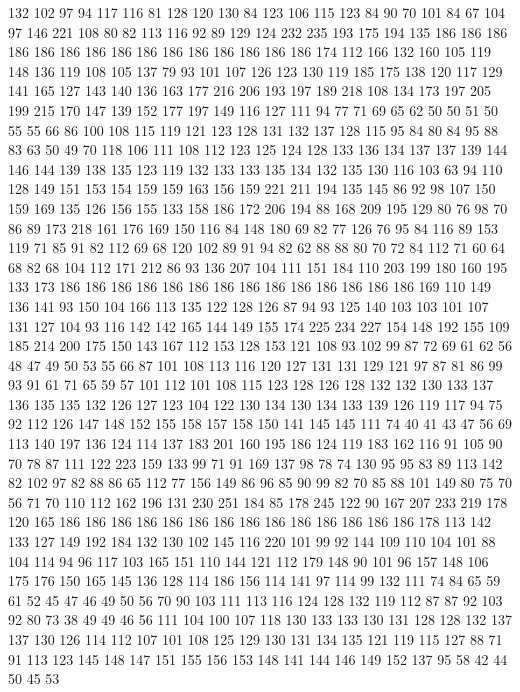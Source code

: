132 102 97 94 117 116 81 128 120 130 84 123 106 115 123 84 90 70 101 84
67 104 97 146 221 108 80 82 113 116 92 89 129 124 232 235 193 175 194 135
186 186 186 186 186 186 186 186 186 186 186 186 186 186 186 174 112 166 132 160
105 119 148 136 119 108 105 137 79 93 101 107 126 123 130 119 185 175 138 120
117 129 141 165 127 143 140 136 163 177 216 206 193 197 189 218 108 134 173 197
205 199 215 170 147 139 152 177 197 149 116 127 111 94 77 71 69 65 62 50
50 51 50 55 55 66 86 100 108 115 119 121 123 128 131 132 137 128 115 95
84 80 84 95 88 83 63 50 49 70 118 106 111 108 112 123 125 124 128 133
136 134 137 137 139 144 146 144 139 138 135 123 119 132 133 133 135 134 132 135
130 116 103 63 94 110 128 149 151 153 154 159 159 163 156 159 221 211 194 135
145 86 92 98 107 150 159 169 135 126 156 155 133 158 186 172 206 194 88 168
209 195 129 80 76 98 70 86 89 173 218 161 176 169 150 116 84 148 180 69
82 77 126 76 95 84 116 89 153 119 71 85 91 82 112 69 68 120 102 89
91 94 82 62 88 88 80 70 72 84 112 71 60 64 68 82 68 104 112 171
212 86 93 136 207 104 111 151 184 110 203 199 180 160 195 133 173 186 186 186
186 186 186 186 186 186 186 186 186 186 186 169 110 149 136 141 93 150 104 166
113 135 122 128 126 87 94 93 125 140 103 103 101 107 131 127 104 93 116 142
142 165 144 149 155 174 225 234 227 154 148 192 155 109 185 214 200 175 150 143
167 112 153 128 153 121 108 93 102 99 87 72 69 61 62 56 48 47 49 50
53 55 66 87 101 108 113 116 120 127 131 131 129 121 97 87 81 86 99 93
91 61 71 65 59 57 101 112 101 108 115 123 128 126 128 132 132 130 133 137
136 135 135 132 126 127 123 104 122 130 134 130 134 133 139 126 119 117 94 75
92 112 126 147 148 152 155 158 157 158 150 141 145 145 111 74 40 41 43 47
56 69 113 140 197 136 124 114 137 183 201 160 195 186 124 119 183 162 116 91
105 90 70 78 87 111 122 223 159 133 99 71 91 169 137 98 78 74 130 95
95 83 89 113 142 82 102 97 82 88 86 65 112 77 156 149 86 96 85 90
99 82 70 85 88 101 149 80 75 70 56 71 70 110 112 162 196 131 230 251
184 85 178 245 122 90 167 207 233 219 178 120 165 186 186 186 186 186 186 186
186 186 186 186 186 186 186 178 113 142 133 127 149 192 184 132 130 102 145 116
220 101 99 92 144 109 110 104 101 88 104 114 94 96 117 103 165 151 110 144
121 112 179 148 90 101 96 157 148 106 175 176 150 165 145 136 128 114 186 156
114 141 97 114 99 132 111 74 84 65 59 61 52 45 47 46 49 50 56 70
90 103 111 113 116 124 128 132 119 112 87 87 92 103 92 80 73 38 49 49
46 56 111 104 100 107 118 130 133 133 130 131 128 128 132 137 137 130 126 114
112 107 101 108 125 129 130 131 134 135 121 119 115 127 88 71 91 113 123 145
148 147 151 155 156 153 148 141 144 146 149 152 137 95 58 42 44 50 45 53
